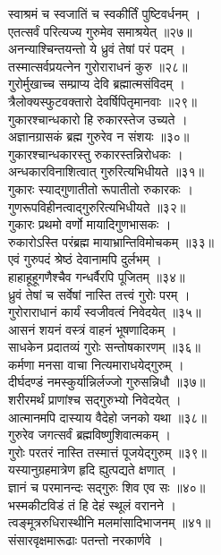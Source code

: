 स्वाश्रमं च स्वजातिं च स्वकीर्तिं पुष्टिवर्धनम् ।\\
एतत्सर्वं परित्यज्य गुरुमेव समाश्रयेत् ॥२७॥\\
अनन्याश्चिन्तयन्तो ये ध्रुवं तेषां परं पदम् ।\\
तस्मात्सर्वप्रयत्नेन गुरोराराधनं कुरु ॥२८॥\\
गुरोर्मुखाच्च सम्प्राप्य देवि ब्रह्मात्मसंविदम् ।\\
त्रैलोक्यस्फुटवक्तारो देवर्षिपितृमानवाः ॥२९॥\\
गुकारश्चान्धकारो हि रुकारस्तेज उच्यते ।\\
अज्ञानग्रासकं ब्रह्म गुरुरेव न संशयः ॥३०॥\\
गुकारश्चान्धकारस्तु रुकारस्तन्निरोधकः ।\\
अन्धकारविनाशित्वात् गुरुरित्यभिधीयते ॥३१॥\\
गुकारः स्याद्गुणातीतो रूपातीतो रुकारकः ।\\
गुणरूपविहीनत्वाद्गुरुरित्यभिधीयते ॥३२॥\\
गुकारः प्रथमो वर्णो मायादिगुणभासकः ।\\
रुकारोऽस्ति परंब्रह्म  मायाभ्रान्तिविमोचकम् ॥३३॥\\
एवं गुरुपदं श्रेष्ठं देवानामपि दुर्लभम् ।\\
हाहाहूहूगणैश्चैव गन्धर्वैरपि पूजितम् ॥३४॥\\
ध्रुवं तेषां च सर्वेषां नास्ति तत्त्वं गुरोः परम् ।\\
गुरोराराधानं कार्यं स्वजीवत्वं निवेदयेत् ॥३५॥\\
आसनं शयनं वस्त्रं वाहनं भूषणादिकम् ।\\
साधकेन प्रदातव्यं गुरोः सन्तोषकारणम् ॥३६॥\\
कर्मणा मनसा वाचा नित्यमाराधयेद्गुरुम् ।\\
दीर्घदण्डं नमस्कुर्यान्निर्लज्जो गुरुसन्निधौ ॥३७॥\\
शरीरमर्थं प्राणांश्च सद्गुरुभ्यो निवेदयेत् ।\\
आत्मानमपि दास्याय वैदेहो जनको यथा ॥३८॥\\
गुरुरेव जगत्सर्वं ब्रह्मविष्णुशिवात्मकम् ।\\
गुरोः परतरं नास्ति तस्मात्तं पूजयेद्गुरुम् ॥३९॥\\
यस्यानुग्रहमात्रेण हृदि ह्युत्पद्यते क्षणात् ।\\
ज्ञानं च परमानन्दः सद्गुरुः शिव एव सः ॥४०॥\\
भस्मकीटविडं तं हि देहं स्थूलं वरानने ।\\
त्वङ्‍मूत्ररुधिरास्थीनि मलमांसादिभाजनम् ॥४१॥\\
संसारवृक्षमारूढाः पतन्तो नरकार्णवे ।\\
